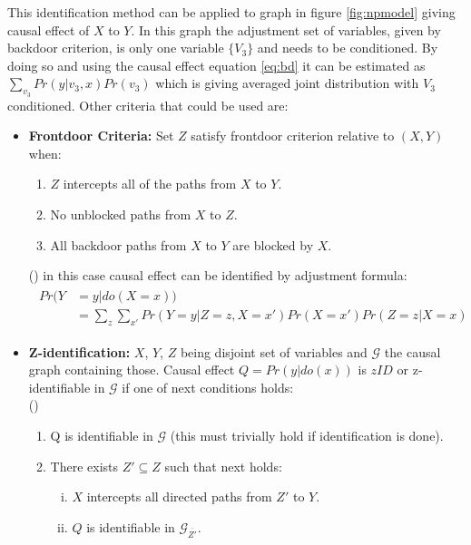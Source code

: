 \documentclass[main=english,12pt,a4paper,pdftex,econ,utf8]{aaltothesis}
\newcommand{\g}{\mathcal{G}}
\begin{document}
\noindent This identification method can be applied to graph in figure \ref{fig:npmodel} giving causal effect of $X$ to $Y$. In this graph the adjustment set of variables, given by backdoor criterion, is only one variable $\{V_{3}\}$ and needs to be conditioned. By doing so and using the causal effect equation \ref{eq:bd} it can be estimated as $\sum_{v_3}Pr(y|v_3,x)Pr(v_3)$ which is giving averaged joint distribution with $V_{3}$ conditioned. Other criteria that could be used are:

\begin{itemize}
    \item[] \textbf{Frontdoor Criteria:} Set $Z$ satisfy frontdoor criterion relative to $(X,Y)$ when:
    \begin{enumerate}
        \item $Z$ intercepts all of the paths from $X$ to $Y$.
        \item No unblocked paths from $X$ to $Z$.
        \item All backdoor paths from $X$ to $Y$ are blocked by $X$.
    \end{enumerate}
    \vspace{-.2cm}
    (\cite{Pearl2016})
    in this case causal effect can be identified by adjustment formula:
    \begin{align} \label{eq:fd}
        \begin{split}
            Pr(Y&=y|do(X=x)) \\ 
            &=\sum_{z}\sum_{x'}Pr(Y=y|Z=z,X=x')Pr(X=x')Pr(Z=z|X=x)
        \end{split}
    \end{align}
    \item[] \textbf{Z-identification:} $X$, $Y$, $Z$ being disjoint set of variables and $\g$ the causal graph containing those. Causal effect $Q=Pr(y|do(x))$ is $zID$ or z-identifiable in $\g$ if one of next conditions holds: \\
    (\cite{Bareinboim2012})
    \begin{enumerate}
        \item\label{item:zid} Q is identifiable in $\g$ (this must trivially hold if identification is done).
        \item There exists $Z'\subseteq Z$ such that next holds:
        \begin{enumerate}[i.]
            \item $X$ intercepts all directed paths from $Z'$ to $Y$.
            \item $Q$ is identifiable in $\g_{\overline{Z'}}$.
        \end{enumerate}
    \end{enumerate}
\end{itemize}
\end{document}
